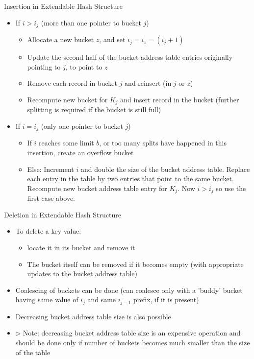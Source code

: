 \documentclass[aspectratio=169, xcolor=dvipsnames]{beamer}
\begin{document}
\begin{frame}{Insertion in Extendable Hash Structure}
    \begin{itemize}[<+->]
        \item If $i > i_j$ (more than one pointer to bucket $j$)
        \begin{itemize}[<+->]
            \item Allocate a new bucket $z$, and set $i_j = i_z = (i_j + 1)$
            \item Update the second half of the bucket address table entries originally pointing to $j$, to point to $z$
            \item Remove each record in bucket $j$ and reinsert (in $j$ or $z$)
            \item Recompute new bucket for $K_j$ and insert record in the bucket (further splitting is required if the bucket is still full)
        \end{itemize}
        \item If $i = i_j$ (only one pointer to bucket $j$)
        \begin{itemize}[<+->]
            \item If $i$ reaches some limit $b$, or too many splits have happened in this insertion, create an overflow bucket
            \item Else: Increment $i$ and double the size of the bucket address table. Replace each entry in the table by two entries that point to the same bucket. Recompute new bucket address table entry for $K_j$. Now $i > i_j$ so use the first case above.
        \end{itemize}
    \end{itemize}
\end{frame}

\begin{frame}{Deletion in Extendable Hash Structure}
    \begin{itemize}[<+->]
        \item To delete a key value:
        \begin{itemize}[<+->]
            \item locate it in its bucket and remove it
            \item The bucket itself can be removed if it becomes empty (with appropriate updates to the bucket address table)
        \end{itemize}
        \item Coalescing of buckets can be done (can coalesce only with a 'buddy' bucket having same value of $i_j$ and same $i_{j-1}$ prefix, if it is present)
        \item Decreasing bucket address table size is also possible
        \item $\triangleright$ Note: decreasing bucket address table size is an expensive operation and should be done only if number of buckets becomes much smaller than the size of the table
    \end{itemize}
\end{frame}
\end{document}
